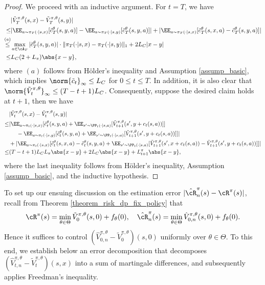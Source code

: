 \documentclass[9pt]{article}
\numberwithin{equation}{section}
\begin{document}
\begin{proof} 
    We proceed with an inductive argument. For $t = T$, we have
    \begin{align*}
        & |{\tilde V_T^{\pi, \theta}(s,x) - \tilde V_T^{\pi, \theta}(s,y)} | \\
        \leq & |\EE_{a \sim \pi_T(\cdot|s,x)}[\tilde{c}_T^\theta(s,y,a)] - \EE_{a \sim \pi_T(\cdot|s,y)}[\tilde{c}_T^\theta(s,y,a)]| + |\EE_{a \sim \pi_T(\cdot|s,x)}[\tilde{c}_T^\theta(s,x,a) - \tilde{c}_T^\theta(s,y,a)]| \\
        \overset{(a)}{\leq} & \max_{a \in \cA_T} |\tilde{c}_T^\theta(s,y,a)| \cdot \|\pi_T(\cdot|s,x) - \pi_T(\cdot|s,y)\|_1 + 2L_C|x-y| \\
        \leq & L_C(2 + L_\pi)\abs{x-y},
    \end{align*}
    where $(a)$ follows from Hölder's inequality and Assumption \ref{assump_basic},
    which implies $\norm{\tilde{c}_t}_\infty \leq L_C$ for $0 \leq t \leq T$.
    In addition, it is also clear that 
    $\norm{\tilde{V}^{\pi, \theta}_t}_\infty \leq  (T-t+1) L_C$.
        Consequently, suppose the desired claim holds at $t+1$, then we have
    \begin{align*}
        & |\tilde V_t^{\pi, \theta}(s,x) - \tilde V_t^{\pi, \theta}(s,y)| \\
        \leq & | \EE_{a \sim \pi_t(\cdot|s,x)}[ \tilde{c}_t^\theta(s,y,a) + \EE_{s' \sim \PP_t(\cdot|s,a)}[ \tilde V_{t+1}^{\pi, \theta}(s', y + c_t(s,a))]] \\
        & ~ ~ ~ ~ - \EE_{a \sim \pi_t(\cdot|s,y)}[\tilde{c}_t^\theta(s,y,a) + \EE_{s' \sim \PP_t(\cdot|s,a)}[ \tilde V_{t+1}^{\pi, \theta}(s', y+ c_t(s,a))]]| \\
        & + |\EE_{a \sim \pi_t(\cdot|s,x)}[\tilde{c}_t^\theta(s,x,a) - \tilde{c}_t^{\theta} (s,y,a) + \EE_{s' \sim \PP_t(\cdot|s,a)}[\tilde V_{t+1}^{\pi, \theta}(s', x + c_t(s,a)) - \tilde V_{t+1}^{\pi, \theta}(s', y + c_t(s,a))]]| \\
         \leq &  
        (T-t+1) L_C L_\pi \abs{x-y}
        + 2L_C \abs{x-y} + L^\pi_{t+1} \abs{x-y},
    \end{align*}
    where the last inequality follows from Hölder's inequality, Assumption \ref{assump_basic}, and the inductive hypothesis. 
\end{proof}
%

To set up our ensuing discussion on the estimation error $|{ \hat{\cR}^\pi_n(s) - \cR^\pi(s)}|$, recall from Theorem \ref{theorem_risk_dp_fix_policy} that 
\begin{align*}
    \cR^\pi(s) = \min_{\theta \in \Theta} \tilde{V}^{\pi, \theta}_0(s,0) + f_\theta(0),  ~~~
        \hat{\cR}_n^\pi(s) = \min_{\theta \in \Theta} \hat{V}^{\pi, \theta}_{0,n}(s,0) + f_\theta(0). 
\end{align*}
Hence it suffices to control 
$(\hat{V}_{0,n}^{\pi, \theta} - \tilde{V}_0^{\pi, \theta})(s,0)$
uniformly over $\theta \in \Theta$.
To this end, we establish below an error decomposition that decomposes 
 $(\hat{V}_{t,n}^{\pi, \theta} - \tilde{V}_t^{\pi, \theta})(s,x)$ into a sum of martingale differences, and subsequently applies Freedman's inequality.
\end{document}
